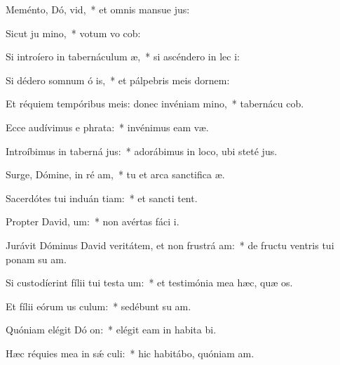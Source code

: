 \item Meménto, Dó, vid,~* et omnis mansue jus:
\item Sicut ju mino,~* votum vo  cob:
\item Si introíero in tabernáculum  æ,~* si ascéndero in lec  i:
\item Si dédero somnum ó is,~* et pálpebris meis dornem:
\item Et réquiem tempóribus meis: donec invéniam  mino,~* tabernácu  cob.
\item Ecce audívimus e  phrata:~* invénimus eam   væ.
\item Introíbimus in taberná jus:~* adorábimus in loco, ubi steté  jus.
\item Surge, Dómine, in ré am,~* tu et arca sanctifica æ.
\item Sacerdótes tui induán tiam:~* et sancti  tent.
\item Propter David,  um:~* non avértas fáci  i.
\item Jurávit Dóminus David veritátem, et non frustrá am:~* de fructu ventris tui ponam su  am.
\item Si custodíerint fílii tui testa um:~* et testimónia mea hæc, quæ  os.
\item Et fílii eórum us  culum:~* sedébunt su  am.
\item Quóniam elégit Dó on:~* elégit eam in habita bi.
\item Hæc réquies mea in sǽ culi:~* hic habitábo, quóniam  am.
